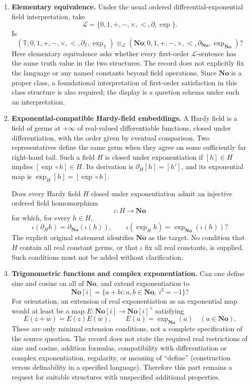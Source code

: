 \documentclass[11pt]{article}
\begin{document}
\begin{enumerate}
\item \textbf{Elementary equivalence.} Under the usual ordered differential-exponential field interpretation, take
\[
\mathcal L=\{0,1,+,-,\times,<,\partial,\exp\}.
\]
Is
\[
(\mathbb T;0,1,+,-,\times,<,\partial_{\mathbb T},\exp_{\mathbb T})
\equiv_{\mathcal L}
(\mathbf{No};0,1,+,-,\times,<,\partial_{\mathbf{No}},\exp_{\mathbf{No}})?
\]
Here elementary equivalence asks whether every first-order \(\mathcal L\)-sentence has the same truth value in the two structures. The record does not explicitly fix the language or any named constants beyond field operations. Since \(\mathbf{No}\) is a proper class, a foundational interpretation of first-order satisfaction in this class structure is also required; the display is a question schema under such an interpretation.

\item \textbf{Exponential-compatible Hardy-field embeddings.} A Hardy field is a field of germs at \(+\infty\) of real-valued differentiable functions, closed under differentiation, with the order given by eventual comparison. Two representatives define the same germ when they agree on some sufficiently far right-hand tail. Such a field \(H\) is closed under exponentiation if \([h]\in H\) implies \([\exp\circ h]\in H\). Its derivation is \(\partial_H[h]=[h']\), and its exponential map is \(\exp_H[h]=[\exp\circ h]\).

Does every Hardy field \(H\) closed under exponentiation admit an injective ordered field homomorphism
\[
\iota:H\longrightarrow\mathbf{No}
\]
for which, for every \(h\in H\),
\[
\iota(\partial_H h)=\partial_{\mathbf{No}}(\iota(h)),
\qquad
\iota(\exp_H h)=\exp_{\mathbf{No}}(\iota(h))?
\]
The explicit original statement identifies \(\mathbf{No}\) as the target. No condition that \(H\) contain all real constant germs, or that \(\iota\) fix all real constants, is supplied. Such conditions must not be added without clarification.

\item \textbf{Trigonometric functions and complex exponentiation.} Can one define sine and cosine on all of \(\mathbf{No}\), and extend exponentiation to
\[
\mathbf{No}[i]=\{a+bi:a,b\in\mathbf{No},\ i^2=-1\}?
\]
For orientation, an extension of real exponentiation as an exponential map would at least be a map \(E:\mathbf{No}[i]\to\mathbf{No}[i]^{\times}\) satisfying
\[
E(z+w)=E(z)E(w),\qquad E(a)=\exp_{\mathbf{No}}(a)
\quad(a\in\mathbf{No}).
\]
These are only minimal extension conditions, not a complete specification of the source question. The record does not state the required real restrictions of sine and cosine, addition formulas, compatibility with differentiation or complex exponentiation, regularity, or meaning of ``define'' (construction versus definability in a specified language). Therefore this part remains a request for suitable structures with unspecified additional properties.


\end{enumerate}
\end{document}
